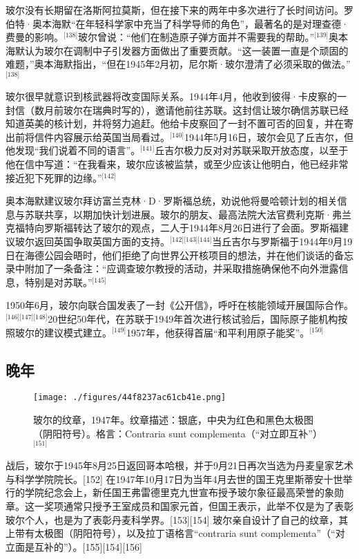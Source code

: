 玻尔没有长期留在洛斯阿拉莫斯，但在接下来的两年中多次进行了长时间访问。罗伯特·奥本海默“在年轻科学家中充当了科学导师的角色”，最著名的是对理查德·费曼的影响。\(^\text{[138]}\)玻尔曾说：“他们在制造原子弹方面并不需要我的帮助。”\(^\text{[139]}\)奥本海默认为玻尔在调制中子引发器方面做出了重要贡献。“这一装置一直是个顽固的难题，”奥本海默指出，“但在1945年2月初，尼尔斯·玻尔澄清了必须采取的做法。”\(^\text{[138]}\)

玻尔很早就意识到核武器将改变国际关系。1944年4月，他收到彼得·卡皮察的一封信（数月前玻尔在瑞典时写的），邀请他前往苏联。这封信让玻尔确信苏联已经知道英美的核计划，并将努力追赶。他给卡皮察回了一封不置可否的回复，并在寄出前将信件内容展示给英国当局看过。\(^\text{[140]}\)1944年5月16日，玻尔会见了丘吉尔，但他发现“我们说着不同的语言”。\(^\text{[141]}\)丘吉尔极力反对对苏联采取开放态度，以至于他在信中写道：“在我看来，玻尔应该被监禁，或至少应该让他明白，他已经非常接近犯下死罪的边缘。”\(^\text{[142]}\)

奥本海默建议玻尔拜访富兰克林·D·罗斯福总统，劝说他将曼哈顿计划的相关信息与苏联共享，以期加快计划进展。玻尔的朋友、最高法院大法官费利克斯·弗兰克福特向罗斯福转达了玻尔的观点，二人于1944年8月26日进行了会面。罗斯福建议玻尔返回英国争取英国方面的支持。\(^\text{[142][143][144]}\)当丘吉尔与罗斯福于1944年9月19日在海德公园会晤时，他们拒绝了向世界公开核项目的想法，并在他们谈话的备忘录中附加了一条备注：“应调查玻尔教授的活动，并采取措施确保他不向外泄露信息，特别是对苏联。”\(^\text{[145]}\)

1950年6月，玻尔向联合国发表了一封《公开信》，呼吁在核能领域开展国际合作。\(^\text{[146][147][148]}\)20世纪50年代，在苏联于1949年首次进行核试验后，国际原子能机构按照玻尔的建议模式建立。\(^\text{[149]}\)1957年，他获得首届“和平利用原子能奖”。\(^\text{[150]}\)
\subsection{晚年}
\begin{figure}[ht]
\centering
\texttt{[image: ./figures/44f8237ac61cb41e.png]}
\caption{玻尔的纹章，1947年。纹章描述：银底，中央为红色和黑色太极图（阴阳符号）。格言：Contraria sunt complementa（“对立即互补”）\(^\text{[151]}\)} \label{fig_NRSbr_11}
\end{figure}
战后，玻尔于1945年8月25日返回哥本哈根，并于9月21日再次当选为丹麦皇家艺术与科学学院院长。[152] 在1947年10月17日为当年4月去世的国王克里斯蒂安十世举行的学院纪念会上，新任国王弗雷德里克九世宣布授予玻尔象征最高荣誉的象勋章。这一奖项通常只授予王室成员和国家元首，但国王表示，此举不仅是为了表彰玻尔个人，也是为了表彰丹麦科学界。[153][154] 玻尔亲自设计了自己的纹章，其上带有太极图（阴阳符号），以及拉丁语格言“contraria sunt complementa”（“对立面是互补的”）。[155][154][156]

